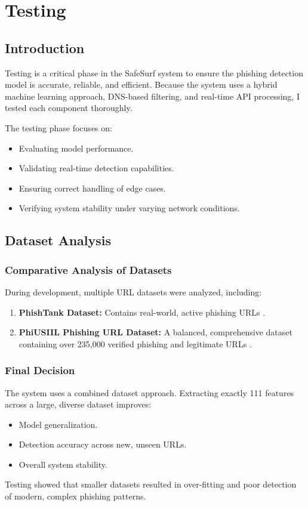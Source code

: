 \chapter{Testing}

\section{Introduction}

Testing is a critical phase in the SafeSurf system to ensure the phishing detection model is accurate, reliable, and efficient. Because the system uses a hybrid machine learning approach, DNS-based filtering, and real-time API processing, I tested each component thoroughly.

\noindent
The testing phase focuses on:
\begin{itemize}
    \item Evaluating model performance.
    \item Validating real-time detection capabilities.
    \item Ensuring correct handling of edge cases.
    \item Verifying system stability under varying network conditions.
\end{itemize}

\section{Dataset Analysis}

\subsection*{Comparative Analysis of Datasets}
\noindent
During development, multiple URL datasets were analyzed, including:
\begin{enumerate}
    \item \textbf{PhishTank Dataset:} Contains real-world, active phishing URLs \cite{ref4}.
    \item \textbf{PhiUSIIL Phishing URL Dataset:} A balanced, comprehensive dataset containing over 235,000 verified phishing and legitimate URLs \cite{ref5}.
\end{enumerate}

\subsection*{Final Decision}
\noindent
The system uses a combined dataset approach. Extracting exactly 111 features across a large, diverse dataset improves:
\begin{itemize}
    \item Model generalization.
    \item Detection accuracy across new, unseen URLs.
    \item Overall system stability.
\end{itemize}
\noindent
Testing showed that smaller datasets resulted in over-fitting and poor detection of modern, complex phishing patterns.

